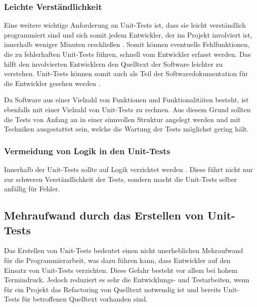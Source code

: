 \subsubsection*{Leichte Verständlichkeit}
Eine weitere wichtige Anforderung an Unit-Tests ist, dass sie leicht verständlich programmiert sind und sich somit jedem Entwickler, der im Projekt involviert ist, innerhalb weniger Minuten erschließen \autocite[vgl.][224]{Osherove2015}. Somit können eventuelle Fehlfunktionen, die zu fehlerhaften Unit-Tests führen, schnell vom Entwickler erfasst werden.
Das hilft den involvierten Entwicklern den Quelltext der Software leichter zu verstehen. Unit-Tests können somit auch als Teil der Softwaredokumentation für die Entwickler gesehen werden \autocite[vgl.][19]{Springer2015}.


Da Software aus einer Vielzahl von Funktionen und Funktionalitäten besteht, ist ebenfalls mit einer Vielzahl von Unit-Tests zu rechnen. Aus diesem Grund sollten die Tests von Anfang an in einer sinnvollen Struktur angelegt werden und mit Techniken ausgestattet sein, welche die Wartung der Tests möglichst gering hält.

\subsubsection*{Vermeidung von Logik in den Unit-Tests}
Innerhalb der Unit-Tests sollte auf Logik verzichtet werden \autocite[vgl.][197]{Osherove2015}. Diese führt nicht nur zur schweren Verständlichkeit der Tests, sondern macht die Unit-Tests selber anfällig für Fehler.

\subsection{Mehraufwand durch das Erstellen von Unit-Tests}
Das Erstellen von Unit-Tests bedeutet einen nicht unerheblichen Mehraufwand für die Programmierarbeit, was dazu führen kann, dass Entwickler auf den Einsatz von Unit-Tests verzichten. Diese Gefahr besteht vor allem bei hohem Termindruck. Jedoch reduziert es sehr die Entwicklungs- und Testarbeiten, wenn für ein Projekt das Refactoring von Quelltext notwendig ist und bereits Unit-Tests für betroffenen Quelltext vorhanden sind.
